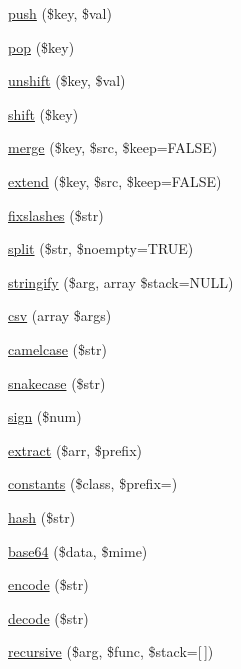 \begin{DoxyCompactItemize}
\item 
\hyperlink{class_base_aef81a11cc1b68233d80e63bcf6fa94f3}{push} (\$key, \$val)
\item 
\hyperlink{class_base_a0a5ec8de186492bebff151ad40b17fa4}{pop} (\$key)
\item 
\hyperlink{class_base_a44e8f53ad45c8f0caa4e438285d08a49}{unshift} (\$key, \$val)
\item 
\hyperlink{class_base_a4ddb1b90cf267ea505ec59db4c6f5134}{shift} (\$key)
\item 
\hyperlink{class_base_a9dc15a0b65021967dad733868514f2a3}{merge} (\$key, \$src, \$keep=F\+A\+L\+SE)
\item 
\hyperlink{class_base_adab2e4455e35467d6012ceaf488a3744}{extend} (\$key, \$src, \$keep=F\+A\+L\+SE)
\item 
\hyperlink{class_base_a052692dd304d0f28451a8fc601fa277e}{fixslashes} (\$str)
\item 
\hyperlink{class_base_ac7b410d4c7145630a45e608d465bb1b5}{split} (\$str, \$noempty=T\+R\+UE)
\item 
\hyperlink{class_base_adb7cb366d6c6e4d4338bc35e76dfaf67}{stringify} (\$arg, array \$stack=N\+U\+LL)
\item 
\hyperlink{class_base_a2f39631e6920b33e0e88713de4566bdc}{csv} (array \$args)
\item 
\hyperlink{class_base_ad8ac953e9fcd497f1ce693e7639911a5}{camelcase} (\$str)
\item 
\hyperlink{class_base_a28e7ef7f4daed47ec1d65760c0a85c27}{snakecase} (\$str)
\item 
\hyperlink{class_base_a94648b79713b75bf4b68864e4f916df4}{sign} (\$num)
\item 
\hyperlink{class_base_abb0deeb7aea6b11961c802cddd6f5925}{extract} (\$arr, \$prefix)
\item 
\hyperlink{class_base_a8906c778c90cf5be4c1d76cd005945c5}{constants} (\$class, \$prefix=\textquotesingle{}\textquotesingle{})
\item 
\hyperlink{class_base_aea8db0058c00fd2bc1351ddb2ebf3191}{hash} (\$str)
\item 
\hyperlink{class_base_a3b0a49639cd46ae1a3a817552b10e242}{base64} (\$data, \$mime)
\item 
\hyperlink{class_base_a27ad9a200330b2a3e71f8fa5df0f3397}{encode} (\$str)
\item 
\hyperlink{class_base_a4afbb486f4a5ff5a8170c832f5997986}{decode} (\$str)
\item 
\hyperlink{class_base_a17f774c561c4ac4a77f691bd98d5b647}{recursive} (\$arg, \$func, \$stack=\mbox{[}$\,$\mbox{]})

\end{DoxyCompactItemize}
